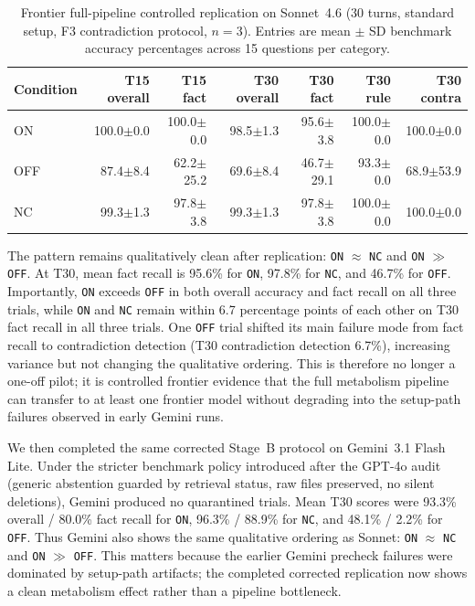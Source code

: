 \documentclass[11pt,a4paper]{article}
\begin{document}
\begin{table}[htbp]
\centering
\caption{Frontier full-pipeline controlled replication on Sonnet~4.6 (30 turns, standard setup, F3 contradiction protocol, $n = 3$). Entries are mean $\pm$ SD benchmark accuracy percentages across 15 questions per category.}
\label{tab:frontier_pipeline}
\small
\begin{tabular}{lrrrrrr}
\toprule
Condition & T15 overall & T15 fact & T30 overall & T30 fact & T30 rule & T30 contra \\
\midrule
ON & 100.0$\pm$0.0 & 100.0$\pm$0.0 & 98.5$\pm$1.3 & 95.6$\pm$3.8 & 100.0$\pm$0.0 & 100.0$\pm$0.0 \\
OFF & 87.4$\pm$8.4 & 62.2$\pm$25.2 & 69.6$\pm$8.4 & 46.7$\pm$29.1 & 93.3$\pm$0.0 & 68.9$\pm$53.9 \\
NC & 99.3$\pm$1.3 & 97.8$\pm$3.8 & 99.3$\pm$1.3 & 97.8$\pm$3.8 & 100.0$\pm$0.0 & 100.0$\pm$0.0 \\
\bottomrule
\end{tabular}
\end{table}

The pattern remains qualitatively clean after replication: \texttt{ON} $\approx$ \texttt{NC} and \texttt{ON} $\gg$ \texttt{OFF}. At T30, mean fact recall is 95.6\% for \texttt{ON}, 97.8\% for \texttt{NC}, and 46.7\% for \texttt{OFF}. Importantly, \texttt{ON} exceeds \texttt{OFF} in both overall accuracy and fact recall on all three trials, while \texttt{ON} and \texttt{NC} remain within 6.7 percentage points of each other on T30 fact recall in all three trials. One \texttt{OFF} trial shifted its main failure mode from fact recall to contradiction detection (T30 contradiction detection 6.7\%), increasing variance but not changing the qualitative ordering. This is therefore no longer a one-off pilot; it is controlled frontier evidence that the full metabolism pipeline can transfer to at least one frontier model without degrading into the setup-path failures observed in early Gemini runs.

We then completed the same corrected Stage~B protocol on Gemini~3.1 Flash Lite. Under the stricter benchmark policy introduced after the GPT-4o audit (generic abstention guarded by retrieval status, raw files preserved, no silent deletions), Gemini produced no quarantined trials. Mean T30 scores were 93.3\% overall / 80.0\% fact recall for \texttt{ON}, 96.3\% / 88.9\% for \texttt{NC}, and 48.1\% / 2.2\% for \texttt{OFF}. Thus Gemini also shows the same qualitative ordering as Sonnet: \texttt{ON} $\approx$ \texttt{NC} and \texttt{ON} $\gg$ \texttt{OFF}. This matters because the earlier Gemini precheck failures were dominated by setup-path artifacts; the completed corrected replication now shows a clean metabolism effect rather than a pipeline bottleneck.
\end{document}
